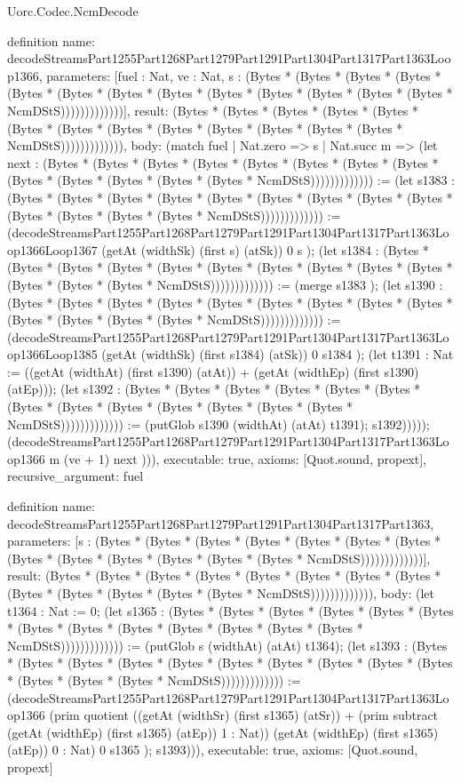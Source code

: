 \begin{lexlean}{Uorc.Codec.NcmDecode}
\begin{semanticmodule}
definition{
  name: decodeStreamsPart1255Part1268Part1279Part1291Part1304Part1317Part1363Loop1366,
  parameters: [fuel : Nat, ve : Nat, s : (Bytes * (Bytes * (Bytes * (Bytes * (Bytes * (Bytes * (Bytes * (Bytes * (Bytes * (Bytes * (Bytes * (Bytes * (Bytes * NcmDStS)))))))))))))],
  result: (Bytes * (Bytes * (Bytes * (Bytes * (Bytes * (Bytes * (Bytes * (Bytes * (Bytes * (Bytes * (Bytes * (Bytes * (Bytes * NcmDStS))))))))))))),
  body: (match fuel
    | Nat.zero => s
    | Nat.succ m => (let next : (Bytes * (Bytes * (Bytes * (Bytes * (Bytes * (Bytes * (Bytes * (Bytes * (Bytes * (Bytes * (Bytes * (Bytes * (Bytes * NcmDStS))))))))))))) := (let s1383 : (Bytes * (Bytes * (Bytes * (Bytes * (Bytes * (Bytes * (Bytes * (Bytes * (Bytes * (Bytes * (Bytes * (Bytes * (Bytes * NcmDStS))))))))))))) := (decodeStreamsPart1255Part1268Part1279Part1291Part1304Part1317Part1363Loop1366Loop1367 (getAt (widthSk) (first s) (atSk)) 0 s ); (let s1384 : (Bytes * (Bytes * (Bytes * (Bytes * (Bytes * (Bytes * (Bytes * (Bytes * (Bytes * (Bytes * (Bytes * (Bytes * (Bytes * NcmDStS))))))))))))) := (merge s1383 ); (let s1390 : (Bytes * (Bytes * (Bytes * (Bytes * (Bytes * (Bytes * (Bytes * (Bytes * (Bytes * (Bytes * (Bytes * (Bytes * (Bytes * NcmDStS))))))))))))) := (decodeStreamsPart1255Part1268Part1279Part1291Part1304Part1317Part1363Loop1366Loop1385 (getAt (widthSk) (first s1384) (atSk)) 0 s1384 ); (let t1391 : Nat := ((getAt (widthAt) (first s1390) (atAt)) + (getAt (widthEp) (first s1390) (atEp))); (let s1392 : (Bytes * (Bytes * (Bytes * (Bytes * (Bytes * (Bytes * (Bytes * (Bytes * (Bytes * (Bytes * (Bytes * (Bytes * (Bytes * NcmDStS))))))))))))) := (putGlob s1390 (widthAt) (atAt) t1391); s1392))))); (decodeStreamsPart1255Part1268Part1279Part1291Part1304Part1317Part1363Loop1366 m (ve + 1) next ))),
  executable: true,
  axioms: [Quot.sound, propext],
  recursive_argument: fuel
}

definition{
  name: decodeStreamsPart1255Part1268Part1279Part1291Part1304Part1317Part1363,
  parameters: [s : (Bytes * (Bytes * (Bytes * (Bytes * (Bytes * (Bytes * (Bytes * (Bytes * (Bytes * (Bytes * (Bytes * (Bytes * (Bytes * NcmDStS)))))))))))))],
  result: (Bytes * (Bytes * (Bytes * (Bytes * (Bytes * (Bytes * (Bytes * (Bytes * (Bytes * (Bytes * (Bytes * (Bytes * (Bytes * NcmDStS))))))))))))),
  body: (let t1364 : Nat := 0; (let s1365 : (Bytes * (Bytes * (Bytes * (Bytes * (Bytes * (Bytes * (Bytes * (Bytes * (Bytes * (Bytes * (Bytes * (Bytes * (Bytes * NcmDStS))))))))))))) := (putGlob s (widthAt) (atAt) t1364); (let s1393 : (Bytes * (Bytes * (Bytes * (Bytes * (Bytes * (Bytes * (Bytes * (Bytes * (Bytes * (Bytes * (Bytes * (Bytes * (Bytes * NcmDStS))))))))))))) := (decodeStreamsPart1255Part1268Part1279Part1291Part1304Part1317Part1363Loop1366 (prim quotient ((getAt (widthSr) (first s1365) (atSr)) + (prim subtract (getAt (widthEp) (first s1365) (atEp)) 1 : Nat)) (getAt (widthEp) (first s1365) (atEp)) 0 : Nat) 0 s1365 ); s1393))),
  executable: true,
  axioms: [Quot.sound, propext]
}


\end{semanticmodule}
\end{lexlean}
